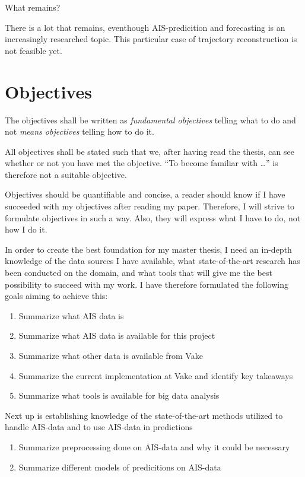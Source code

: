 \begin{info}
	What remains?
\end{info}
There is a lot that remains, eventhough AIS-predicition and forecasting is an increasingly researched topic. This particular case of trajectory reconstruction is not feasible yet.





\section{Objectives}
\label{sec:objectives}
\begin{info}
	The objectives shall be written as \emph{fundamental objectives} telling what to do and not \emph{means objectives} telling how to do it.

	All objectives shall be stated such that we, after having read the thesis, can see whether or not you have met the objective. ``To become familiar with \ldots'' is therefore not a suitable objective.
\end{info}
Objectives should be quantifiable and concise, a reader should know if I have succeeded with my objectives after reading my paper. Therefore, I will strive to formulate objectives in such a way. Also, they will express what I have to do, not how I do it. 

In order to create the best foundation for my master thesis, I need an in-depth knowledge of the data sources I have available, what state-of-the-art research has been conducted on the domain, and what tools that will give me the best possibility to succeed with my work. I have therefore formulated the following goals aiming to achieve this:
\begin{enumerate}
	\item Summarize what AIS data is
	\item Summarize what AIS data is available for this project
	\item Summarize what other data is available from Vake
	\item Summarize the current implementation at Vake and identify key takeaways
	\item Summarize what tools is available for big data analysis
\end{enumerate}

Next up is establishing knowledge of the state-of-the-art methods utilized to handle AIS-data and to use AIS-data in predictions
\begin{enumerate}
	\item Summarize preprocessing done on AIS-data and why it could be necessary
	\item Summarize different models of predicitions on AIS-data
\end{enumerate}

